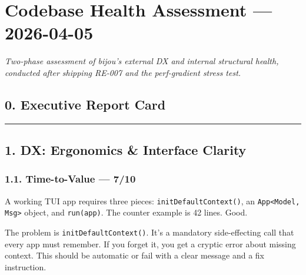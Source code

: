 \chapter{Codebase Health Assessment --- 2026-04-05}\label{record-411}

\smallskip

\emph{Two-phase assessment of bijou's external DX and internal structural health, conducted after shipping RE-007 and the perf-gradient stress test.}

\section{0. Executive Report Card}\label{record-411-executive-report-card}



\begin{center}\rule{0.5\linewidth}{0.5pt}\end{center}

\section{1. DX: Ergonomics \& Interface Clarity}\label{record-411-dx-ergonomics-interface-clarity}

\subsection{1.1. Time-to-Value --- 7/10}\label{record-411-time-to-value-710}

A working TUI app requires three pieces: \texttt{i\allowbreak{}n\allowbreak{}i\allowbreak{}t\allowbreak{}D\allowbreak{}e\allowbreak{}f\allowbreak{}a\allowbreak{}u\allowbreak{}l\allowbreak{}t\allowbreak{}C\allowbreak{}o\allowbreak{}n\allowbreak{}t\allowbreak{}e\allowbreak{}x\allowbreak{}t\allowbreak{}(\allowbreak{})}, an \texttt{A\allowbreak{}p\allowbreak{}p\allowbreak{}<\allowbreak{}M\allowbreak{}o\allowbreak{}d\allowbreak{}e\allowbreak{}l\allowbreak{},\allowbreak{} \allowbreak{}M\allowbreak{}s\allowbreak{}g\allowbreak{}>} object, and \texttt{r\allowbreak{}u\allowbreak{}n\allowbreak{}(\allowbreak{}a\allowbreak{}p\allowbreak{}p\allowbreak{})}. The counter example is 42 lines. Good.

The problem is \texttt{i\allowbreak{}n\allowbreak{}i\allowbreak{}t\allowbreak{}D\allowbreak{}e\allowbreak{}f\allowbreak{}a\allowbreak{}u\allowbreak{}l\allowbreak{}t\allowbreak{}C\allowbreak{}o\allowbreak{}n\allowbreak{}t\allowbreak{}e\allowbreak{}x\allowbreak{}t\allowbreak{}(\allowbreak{})}. It's a mandatory side-effecting call that every app must remember. If you forget it, you get a cryptic error about missing context. This should be automatic or fail with a clear message and a fix instruction.


